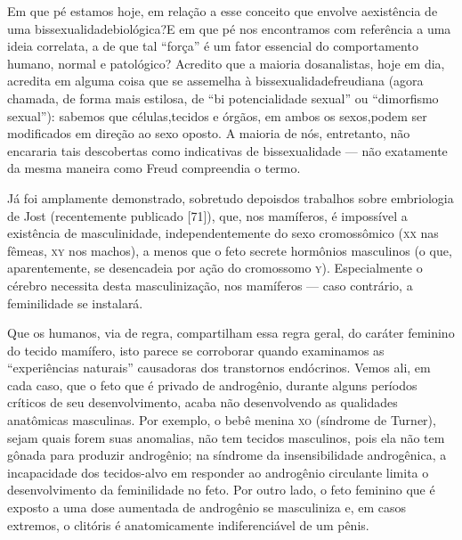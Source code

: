  Em que pé estamos hoje, em relação a esse conceito que envolve a\idxprenat[|(]
existência de uma bissexualidade\idxbisse[|(] biológica?\idxsexopiden[|(] E em que pé nos encontramos
com referência a uma ideia correlata, a de que tal
``força'' é um fator essencial do\idxsexopiden{}
comportamento humano, normal e patológico? Acredito que a maioria dos\idxsexod[|(]
analistas, hoje em dia, acredita em alguma coisa que se assemelha à
bissexualidade\idxbissedese[|(] freudiana (agora chamada, de forma mais estilosa, de
``bi potencialidade sexual'' ou
``dimorfismo sexual''): sabemos que células,\idxhormdese[|(]
tecidos e órgãos, em ambos os sexos,\idxidenpre[|(] podem ser modificados em direção
ao sexo oposto. A maioria de nós, entretanto, não encararia tais
descobertas como indicativas de bissexualidade --- não exatamente da
mesma maneira como Freud compreendia o termo.

 Já foi amplamente demonstrado, sobretudo depois\idxcondfsupr[|(] dos trabalhos sobre
embriologia de\idxjost{} Jost (recentemente publicado [71]), que, nos mamíferos,
é impossível a existência de masculinidade, independentemente do sexo
cromossômico (\textsc{xx} nas fêmeas, \textsc{xy} nos machos),
a menos que o feto secrete hormônios masculinos (o que, aparentemente,
se desencadeia por ação do cromossomo \textsc{y}). Especialmente o cérebro necessita
desta masculinização, nos mamíferos --- caso contrário, a feminilidade se instalará.

 Que os humanos, via de regra, compartilham essa regra geral, do caráter
feminino do tecido mamífero, isto parece se corroborar quando
examinamos as ``experiências naturais''\idxexpen{}
causadoras dos transtornos endócrinos.\idxanimdese{} Vemos ali, em cada caso, que o
feto que é privado de androgênio,\idxandrn{} durante alguns períodos críticos de
seu desenvolvimento, acaba não desenvolvendo as qualidades anatômicas
masculinas. Por exemplo, o bebê menina \textsc{xo} (síndrome de Turner),\idxturner{} sejam
quais forem suas anomalias, não tem tecidos masculinos, pois ela não
tem gônada para produzir androgênio; na síndrome da insensibilidade
androgênica,\idxandrs{} a incapacidade dos tecidos-alvo em responder ao androgênio
circulante limita o desenvolvimento da feminilidade no feto. Por outro
lado, o feto feminino que é exposto a uma dose aumentada de androgênio
se masculiniza e,\idxadren{} em casos extremos, o clitóris\idxclitdese{} é anatomicamente
indiferenciável de um pênis.

